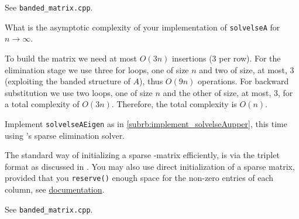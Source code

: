 \begin{problem}
\begin{subproblem}[3]
 \begin{solution}
  See \texttt{banded\_matrix.cpp}.
 \end{solution}
\end{subproblem}

\begin{subproblem}[1]
 What is the asymptotic complexity of your implementation of \verb|solvelseA| for $n \rightarrow \infty$.
 
 \begin{solution}
  To build the matrix we need at most $O(3n)$ insertions (3 per row). For the elimination stage we use three for loops, one of size $n$ and two of size, at most, 3 (exploiting the banded structure of $A$), thus $O(9n)$ operations. For backward substitution we use two loops, one of size $n$ and the other of size, at most, 3, for a total complexity of $O(3n)$. Therefore, the total complexity is $O(n)$.
 \end{solution}
\end{subproblem}

\begin{subproblem}[2]
 Implement \verb|solvelseAEigen| as in \ref{subrb:implement_solvelseAupper}, this time using \Eigen's sparse elimination solver.
 
 \begin{hint}
   The standard way of initializing a sparse \eigen{}-matrix efficiently, is via
   the triplet format as discussed in . 
   You may also use direct initialization of a sparse matrix, provided that you 
   \verb|reserve()| enough space for the non-zero entries of each column, see 
   \href{http://eigen.tuxfamily.org/dox/group__TutorialSparse.html}{documentation}.
 \end{hint}

 \begin{solution}
  See \texttt{banded\_matrix.cpp}.
 \end{solution}
\end{subproblem}


\end{problem}

